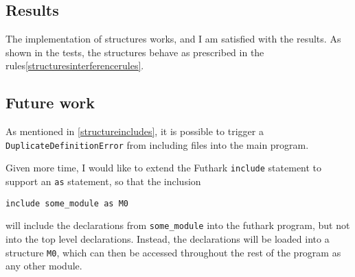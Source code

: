\subsection{Results}
\label{subsec:structuresresults}
The implementation of structures works, and I am satisfied with the results. As
shown in the tests, the structures behave as prescribed in the rules\ref{structuresinterferencerules}.
\subsection{Future work}
\label{subsec:structuresfuturework}
As mentioned in \ref{structureincludes}, it is possible to trigger a
\texttt{DuplicateDefinitionError} from including files into the main program.

Given more time, I would like to extend the Futhark \texttt{include} statement
to support an \texttt{as} statement, so that the inclusion

\texttt{include some\_module as M0}

will include the declarations from \texttt{some\_module} into the futhark program, but not
into the top level declarations. Instead, the declarations will be loaded into a
structure \texttt{M0}, which can then be accessed throughout the rest of the program as
any other module.
